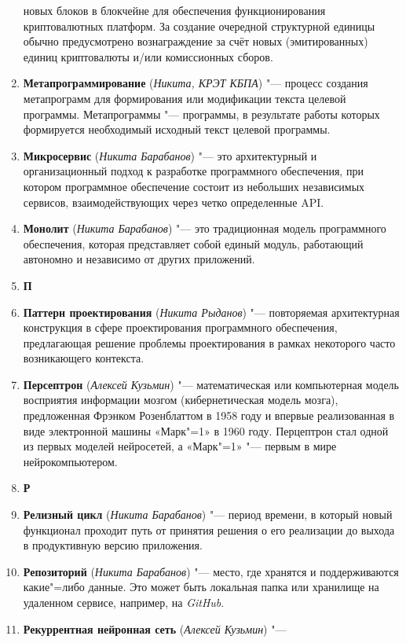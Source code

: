 \documentclass[a4paper, 14 pt]{extarticle}
\begin{document}
\begin{enumerate}
    новых блоков в блокчейне для обеспечения функционирования криптовалютных 
    платформ. За создание очередной структурной единицы обычно предусмотрено 
    вознаграждение за счёт новых (эмитированных) единиц криптовалюты и/или 
    комиссионных сборов.
    \item \textbf{Метапрограммирование} (\textit{Никита, КРЭТ КБПА}) "--- 
    процесс создания метапрограмм для формирования или модификации текста 
    целевой программы. Метапрограммы "--- программы, в результате работы которых 
    формируется необходимый исходный текст целевой программы.
    \item \textbf{Микросервис} (\textit{Никита Барабанов}) "--- это 
    архитектурный и организационный подход к разработке программного 
    обеспечения, при котором программное обеспечение состоит из небольших 
    независимых сервисов, взаимодействующих через четко определенные API.
    \item \textbf{Монолит} (\textit{Никита Барабанов}) "--- это традиционная 
    модель программного обеспечения, которая представляет собой единый модуль, 
    работающий автономно и независимо от других приложений.
    \item[] \textbf{П}
    \item \textbf{Паттерн проектирования} (\textit{Никита Рыданов}) "--- 
    повторяемая архитектурная конструкция в сфере проектирования программного 
    обеспечения, предлагающая решение проблемы проектирования в рамках 
    некоторого часто возникающего контекста.
    \item \textbf{Персептрон} (\textit{Алексей Кузьмин}) "--- математическая или
    компьютерная модель восприятия информации мозгом (кибернетическая модель 
    мозга), предложенная Фрэнком Розенблаттом в 1958 году и впервые 
    реализованная в виде электронной машины «Марк"=1» в 1960 году. Перцептрон 
    стал одной из первых моделей нейросетей, а «Марк"=1» "--- первым в мире 
    нейрокомпьютером.
    \item[] \textbf{Р}
    \item \textbf{Релизный цикл} (\textit{Никита Барабанов}) "--- период 
    времени, в который новый функционал проходит путь от принятия решения о его 
    реализации до выхода в продуктивную версию приложения.
    \item \textbf{Репозиторий} (\textit{Никита Барабанов}) "--- место, где 
    хранятся и поддерживаются какие"=либо данные. Это может быть локальная папка
    или хранилище на удаленном сервисе, например, на \textit{GitHub}.
    \item \textbf{Рекуррентная нейронная сеть} (\textit{Алексей Кузьмин}) "--- 

\end{enumerate}
\end{document}
